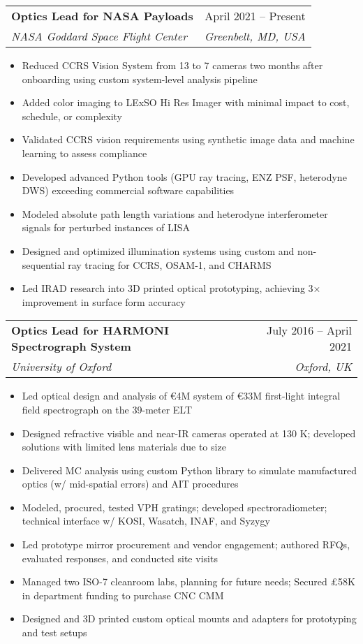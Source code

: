 \documentclass[letterpaper,11pt]{article}
\makeatletter
\newcommand{\resumeItem}[1]{
  \item\small{
    {#1 \vspace{-2pt}}
  }
}
\newcommand{\resumeSubheading}[4]{
  \vspace{-2pt}\item
    \begin{tabular*}{0.97\textwidth}[t]{l@{\extracolsep{\fill}}r}
      \textbf{#1} & #2 \\
      \textit{\small#3} & \textit{\small #4} \\
    \end{tabular*}\vspace{-7pt}
}
\newcommand{\resumeItemListStart}{\begin{itemize}[leftmargin=0.15in]}
\newcommand{\resumeItemListEnd}{\end{itemize}\vspace{-5pt}}
\makeatother
\begin{document}
    \resumeSubheading
      {Optics Lead for NASA Payloads}{April 2021 -- Present}
      {NASA Goddard Space Flight Center}{Greenbelt, MD, USA}
      \resumeItemListStart
        \resumeItem{Reduced CCRS Vision System from 13 to 7 cameras two months after onboarding using custom system-level analysis pipeline}
        \resumeItem{Added color imaging to LExSO Hi Res Imager with minimal impact to cost, schedule, or complexity}
        \resumeItem{Validated CCRS vision requirements using synthetic image data and machine learning to assess compliance}
        \resumeItem{Developed advanced Python tools (GPU ray tracing, ENZ PSF, heterodyne DWS) exceeding commercial software capabilities}
        \resumeItem{Modeled absolute path length variations and heterodyne interferometer signals for perturbed instances of LISA}
        \resumeItem{Designed and optimized illumination systems using custom and non-sequential ray tracing for CCRS, OSAM-1, and CHARMS}
        \resumeItem{Led IRAD research into 3D printed optical prototyping, achieving 3× improvement in surface form accuracy}
      \resumeItemListEnd

    \resumeSubheading 
      {Optics Lead for HARMONI Spectrograph System}{July 2016 -- April 2021}
      {University of Oxford}{Oxford, UK}
      \resumeItemListStart
        \resumeItem{Led optical design and analysis of €4M system of €33M first-light integral field spectrograph on the 39-meter ELT}
        \resumeItem{Designed refractive visible and near-IR cameras operated at 130 K; developed solutions with limited lens materials due to size}
        \resumeItem{Delivered MC analysis using custom Python library to simulate manufactured optics (w/ mid-spatial errors) and AIT procedures}
        \resumeItem{Modeled, procured, tested VPH gratings; developed spectroradiometer; technical interface w/ KOSI, Wasatch, INAF, and Syzygy}
        \resumeItem{Led prototype mirror procurement and vendor engagement; authored RFQs, evaluated responses, and conducted site visits}
        \resumeItem{Managed two ISO-7 cleanroom labs, planning for future needs; Secured £58K in department funding to purchase CNC CMM}
        \resumeItem{Designed and 3D printed custom optical mounts and adapters for prototyping and test setups}
      \resumeItemListEnd
\end{document}
